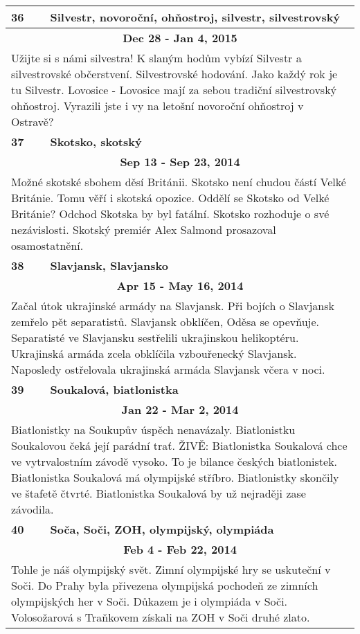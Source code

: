 \begin{tabularx}{\linewidth}{l l}
\bf 36 & \bf Silvestr, novoroční, ohňostroj, silvestr, silvestrovský \\ \midrule
\multicolumn{2}{c}{\bf Dec 28 - Jan 4, 2015} \\
\multicolumn{2}{p{\linewidth}}{Užijte si s námi silvestra! K slaným hodům vybízí Silvestr a silvestrovské občerstvení. Silvestrovské hodování. Jako každý rok je tu Silvestr. Lovosice - Lovosice mají za sebou tradiční silvestrovský ohňostroj. Vyrazili jste i vy na letošní novoroční ohňostroj v Ostravě?} \\ \midrule[1.5pt]

\bf 37 & \bf Skotsko, skotský \\ \midrule
\multicolumn{2}{c}{\bf Sep 13 - Sep 23, 2014} \\
\multicolumn{2}{p{\linewidth}}{Možné skotské sbohem děsí Británii. Skotsko není chudou částí Velké Británie. Tomu věří i skotská opozice. Oddělí se Skotsko od Velké Británie? Odchod Skotska by byl fatální. Skotsko rozhoduje o své nezávislosti. Skotský premiér Alex Salmond prosazoval osamostatnění.} \\ \midrule[1.5pt]

\bf 38 & \bf Slavjansk, Slavjansko \\ \midrule
\multicolumn{2}{c}{\bf Apr 15 - May 16, 2014} \\
\multicolumn{2}{p{\linewidth}}{Začal útok ukrajinské armády na Slavjansk. Při bojích o Slavjansk zemřelo pět separatistů. Slavjansk obklíčen, Oděsa se opevňuje. Separatisté ve Slavjansku sestřelili ukrajinskou helikoptéru. Ukrajinská armáda zcela obklíčila vzbouřenecký Slavjansk. Naposledy ostřelovala ukrajinská armáda Slavjansk včera v noci.} \\ \midrule[1.5pt]

\bf 39 & \bf Soukalová, biatlonistka \\ \midrule
\multicolumn{2}{c}{\bf Jan 22 - Mar 2, 2014} \\
\multicolumn{2}{p{\linewidth}}{Biatlonistky na Soukupův úspěch nenavázaly. Biatlonistku Soukalovou čeká její parádní trať. ŽIVĚ: Biatlonistka Soukalová chce ve vytrvalostním závodě vysoko. To je bilance českých biatlonistek. Biatlonistka Soukalová má olympijské stříbro. Biatlonistky skončily ve štafetě čtvrté. Biatlonistka Soukalová by už nejraději zase závodila.} \\ \midrule[1.5pt]

\bf 40 & \bf Soča, Soči, ZOH, olympijský, olympiáda \\ \midrule
\multicolumn{2}{c}{\bf Feb 4 - Feb 22, 2014} \\
\multicolumn{2}{p{\linewidth}}{Tohle je náš olympijský svět. Zimní olympijské hry se uskuteční v Soči. Do Prahy byla přivezena olympijská pochodeň ze zimních olympijských her v Soči. Důkazem je i olympiáda v Soči. Volosožarová s Traňkovem získali na ZOH v Soči druhé zlato.} \\ \midrule[1.5pt]


\end{tabularx}
